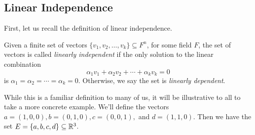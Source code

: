 \documentclass[12pt,oneside]{../../sfsuthesis}
\begin{document}
\subsection{Linear Independence}
First, let us recall the definition of linear independence.
\begin{definition}\th\label{def:lin_independence}
    Given a finite set of vectors \( \{ v_1, v_2, \dots, v_k \} \subseteq F^n \), for some field \( F \),
    the set of vectors is called \emph{linearly independent} if the only solution to the linear combination
    \[
        \alpha_1 v_1 + \alpha_2 v_2 + \cdots + \alpha_k v_k = 0
    \]
    is \( \alpha_1 = \alpha_2 = \cdots = \alpha_k = 0 \).
    Otherwise, we say the set is \emph{linearly dependent}.
\end{definition}
While this is a familiar definition to many of us, it will be illustrative to all to take a more concrete example.
We'll define the vectors \( a = (1, 0, 0), b = (0, 1, 0), c = (0, 0, 1), \) and \( d = (1, 1, 0) \).
Then we have the set \( E = \{ a, b, c, d \} \subseteq \mathbb{R}^3 \).
\end{document}
